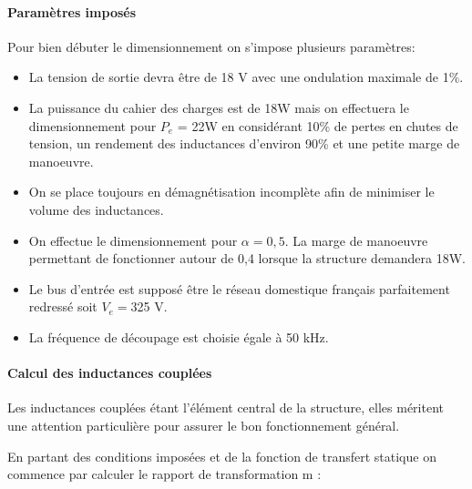 \documentclass[12pt]{article}
\begin{document}
\paragraph{Paramètres imposés}

Pour bien débuter le dimensionnement on s'impose plusieurs paramètres:\par
\vspace{10pt}

\begin{itemize}
\item La tension de sortie devra être de 18 V avec une ondulation maximale de 1$\%$.
\item La puissance du cahier des charges est de 18W mais on effectuera le dimensionnement pour $P_e$ = 22W en considérant 10\% de pertes en chutes de tension, un rendement des inductances d'environ 90\% et une petite marge de manoeuvre.
\item On se place toujours en démagnétisation incomplète afin de minimiser le volume des inductances.
\item On effectue le dimensionnement pour $\alpha = 0,5$. La marge de manoeuvre permettant de fonctionner autour de 0,4 lorsque la structure demandera 18W. 
\item Le bus d'entrée est supposé être le réseau domestique français parfaitement redressé soit $V_e = $325 V. 
\item La fréquence de découpage est choisie égale à 50 kHz.
\end{itemize}

\vspace{10pt}

%  
%  
%  



\paragraph{Calcul des inductances couplées}

Les inductances couplées étant l'élément central de la structure, elles méritent une attention particulière pour assurer le bon fonctionnement général. 


En partant des conditions imposées et de la fonction de transfert statique on commence par calculer le rapport de transformation m :\par
\end{document}
